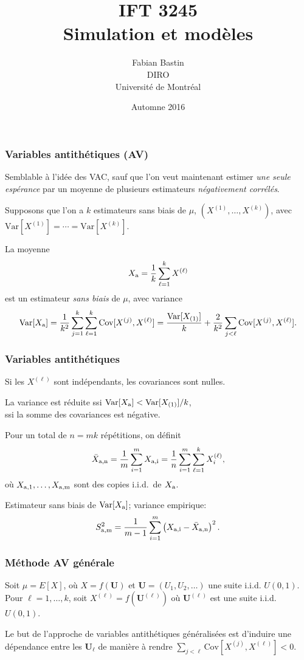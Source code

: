 \documentclass[t,usepdftitle=false]{beamer}
\title[IFT3245]{IFT 3245\\Simulation et modèles}
\author[Fabian Bastin]{Fabian Bastin\\DIRO\\Université de Montréal}
\date{Automne 2016}
\def\bU{\boldsymbol{U}}
\def\Var{\mbox{Var}}
\def\Cov{\mbox{Cov}}
\def\iid{i.i.d.}
\begin{document}
\frame{\titlepage}

\begin{frame}
\frametitle{Variables antithétiques (AV)}

Semblable \`a l'idée des VAC, sauf que l'on veut maintenant estimer
\emph{une seule espérance} par un moyenne de plusieurs estimateurs
\emph{négativement corrélés}.

\mbox{}

Supposons que l'on a ${k}$ estimateurs sans biais de ${\mu}$,
$({X^{(1)}},\dots, {X^{(k)}})$, avec 
$\Var[X^{(1)}] = \cdots = \Var[X^{(k)}]$.

\mbox{}

La moyenne
\[
  {X_{\rm a}} = \frac{1}{k}\sum_{\ell=1}^k X^{(\ell)}
\]
est un estimateur \emph{sans biais} de $\mu$, avec variance 
\[
 {\Var[X_{\rm a}]} = 
  \frac{1}{k^2} \sum_{j=1}^k \sum_{\ell=1}^k \Cov[X^{(j)}, X^{(\ell)}] 
  = \frac{\Var[X_{(1)}]}{k} 
     + \frac{2}{k^2}\sum_{j<\ell} \Cov[X^{(j)}, X^{(\ell)}].
\]

\end{frame}

\begin{frame}
\frametitle{Variables antithétiques}

Si les $X^{(\ell)}$ sont indépendants, les covariances sont nulles.

\mbox{}

La variance est réduite ssi $\Var[X_{\rm a}] < \Var[X_{(1)}]/{k}$, \\
ssi la somme des covariances est négative.

\mbox{}

Pour un total de ${n} = mk$ répétitions, on définit
\[
  {\bar X_{\rm a,n}} 
   = {1\over m} \sum_{i=1}^{m} X_{\rm a,i}
   = {1\over n} \sum_{i=1}^{m} \sum_{\ell=1}^k X_i^{(\ell)},
\]
o\`u ${X_{\rm a,1}}, \dots, {X_{\rm a,m}}$
sont des copies \iid\ de $X_{\rm a}$.

\mbox{}

Estimateur sans biais de $\Var[X_{\rm a}]$; variance empirique:
\[
  {S_{\rm a,m}^2} 
  = {1\over m-1} \sum_{i=1}^{m} 
    \left(X_{\rm a,i} - \bar X_{\rm a,n}\right)^2.
\]

\end{frame}

\begin{frame}
\frametitle{Méthode AV générale}

Soit ${\mu} = E[X]$, o\`u ${X} = f(\bU)$ et 
$\bU = ({U_1},{U_2},\dots)$ une suite \iid{} $U(0,1)$.
Pour ${\ell}=1,\dots,k$, soit ${X^{(\ell)}} = f(\bU^{(\ell)})$ 
o\`u ${\bU^{(\ell)}}$ est une suite \iid{} $U(0,1)$.

\mbox{}

Le but de l'approche de variables antithétiques généralisées est
d'induire une dépendance entre les $\bU_\ell$ de manière \`a rendre
$\sum_{j<\ell} \Cov[X^{(j)}, X^{(\ell)}] < 0$.

\end{frame}
\end{document}
